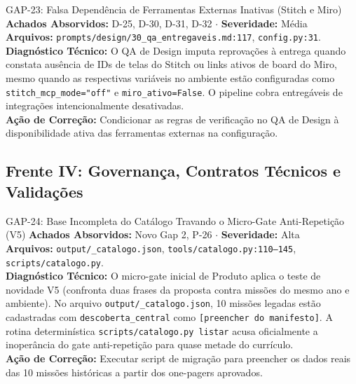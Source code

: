 \documentclass[11pt,a4paper]{article}
\begin{document}
\begin{gapbox}{GAP-23: Falsa Dependência de Ferramentas Externas Inativas (Stitch e Miro)}
\textbf{Achados Absorvidos:} D-25, D-30, D-31, D-32 $\cdot$ \textbf{Severidade:} Média\\
\textbf{Arquivos:} \texttt{prompts/design/30\_qa\_entregaveis.md:117}, \texttt{config.py:31}.\\
\textbf{Diagnóstico Técnico:} O QA de Design imputa reprovações à entrega quando constata ausência de IDs de telas do Stitch ou links ativos de board do Miro, mesmo quando as respectivas variáveis no ambiente estão configuradas como \texttt{stitch\_mcp\_mode="off"} e \texttt{miro\_ativo=False}. O pipeline cobra entregáveis de integrações intencionalmente desativadas.\\
\textbf{Ação de Correção:} Condicionar as regras de verificação no QA de Design à disponibilidade ativa das ferramentas externas na configuração.
\end{gapbox}

\newpage
\subsection{Frente IV: Governança, Contratos Técnicos e Validações}

\begin{gapbox}{GAP-24: Base Incompleta do Catálogo Travando o Micro-Gate Anti-Repetição (V5)}
\textbf{Achados Absorvidos:} Novo Gap 2, P-26 $\cdot$ \textbf{Severidade:} Alta\\
\textbf{Arquivos:} \texttt{output/\_catalogo.json}, \texttt{tools/catalogo.py:110--145}, \texttt{scripts/catalogo.py}.\\
\textbf{Diagnóstico Técnico:} O micro-gate inicial de Produto aplica o teste de novidade V5 (confronta duas frases da proposta contra missões do mesmo ano e ambiente). No arquivo \texttt{output/\_catalogo.json}, 10 missões legadas estão cadastradas com \texttt{descoberta\_central} como \texttt{[preencher do manifesto]}. A rotina determinística \texttt{scripts/catalogo.py listar} acusa oficialmente a inoperância do gate anti-repetição para quase metade do currículo.\\
\textbf{Ação de Correção:} Executar script de migração para preencher os dados reais das 10 missões históricas a partir dos one-pagers aprovados.
\end{gapbox}
\end{document}
